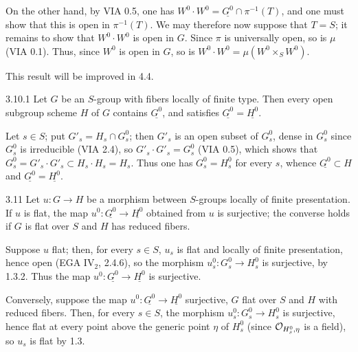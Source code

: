 On the other hand, by VIA 0.5, one has $W^0\cdot W^0=\underline{G^0}\cap\pi^{-1}(T)$, and one must show that this is open in $\pi^{-1}(T)$. We may therefore now suppose that $T=S$; it remains to show that $W^0\cdot W^0$ is open in $G$. Since $\pi$ is universally open, so is $\mu$ (VIA 0.1). Thus, since $W^0$ is open in $G$, so is $W^0\cdot W^0=\mu(W^0\times_SW^0)$.

This result will be improved in 4.4.
\begin{lemma}{3.10.1}\label{VIB.3.10.1}
Let $G$ be an $S$-group with fibers locally of finite type. Then every open subgroup scheme $H$ of $G$ contains $\underline{G^0}$, and satisfies $\underline{G^0}=\underline{H^0}$.
\end{lemma}
Let $s\in S$; put $G'_s=H_s\cap G_s^0$; then $G'_s$ is an open subset of $G_s^0$, dense in $G_s^0$ since $G_s^0$ is irreducible (VIA 2.4), so $G'_s\cdot G'_s=G_s^0$ (VIA 0.5), which shows that $G_s^0=G'_s\cdot G'_s\subset H_s\cdot H_s=H_s$. Thus one has $G_s^0=H_s^0$ for every $s$, whence $\underline{G^0}\subset H$ and $\underline{G^0}=\underline{H^0}$.
\begin{proposition}{3.11}\label{VIB.3.11}
Let $u:G\to H$ be a morphism between $S$-groups locally of finite presentation. If $u$ is flat, the map $u^0:\underline{G^0}\to\underline{H^0}$ obtained from $u$ is surjective; the converse holds if $G$ is flat over $S$ and $H$ has reduced fibers.
\end{proposition}
Suppose $u$ flat; then, for every $s\in S$, $u_s$ is flat and locally of finite presentation, hence open (EGA IV$_2$, 2.4.6), so the morphism $u_s^0:G_s^0\to H_s^0$ is surjective, by 1.3.2. Thus the map $u^0:\underline{G^0}\to\underline{H^0}$ is surjective.

Conversely, suppose the map $u^0:\underline{G^0}\to\underline{H^0}$ surjective, $G$ flat over $S$ and $H$ with reduced fibers. Then, for every $s\in S$, the morphism $u_s^0:G_s^0\to H_s^0$ is surjective, hence flat at every point above the generic point $\eta$ of $H_s^0$ (since $\mathcal{O}_{H_s^0,\eta}$ is a field), so $u_s$ is flat by 1.3.
